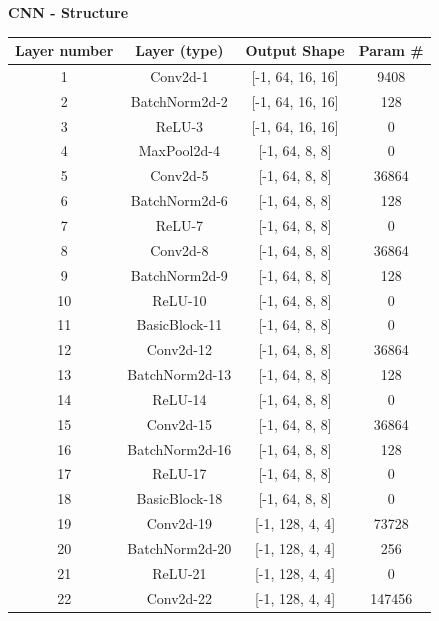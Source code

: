 \documentclass[UTF-8]{article}
\begin{document}
\newpage
\textbf{CNN - Structure}
\begin{center}
	\begin{tabular}{|c|c|c|c|}
		\hline
		Layer number &         Layer (type)   &     Output Shape   &   Param \# \\
		\hline
		\hline
		1 &             Conv2d-1   & [-1, 64, 16, 16]   & 9408 \\
		\hline
		2 &        BatchNorm2d-2   & [-1, 64, 16, 16]   & 128 \\
		\hline
		3 &               ReLU-3   & [-1, 64, 16, 16]   & 0 \\
		\hline
		4 &          MaxPool2d-4   &   [-1, 64, 8, 8]   & 0 \\
		\hline
		5 &             Conv2d-5   &   [-1, 64, 8, 8]   & 36864 \\
		\hline
		6 &        BatchNorm2d-6   &   [-1, 64, 8, 8]   & 128 \\
		\hline
		7 &               ReLU-7   &   [-1, 64, 8, 8]   & 0 \\
		\hline
		8 &             Conv2d-8   &   [-1, 64, 8, 8]   & 36864 \\
		\hline
		9 &        BatchNorm2d-9   &   [-1, 64, 8, 8]   & 128 \\
		\hline
		10 &              ReLU-10   &   [-1, 64, 8, 8]   & 0 \\
		\hline
		11 &        BasicBlock-11   &   [-1, 64, 8, 8]   & 0 \\
		\hline
		12 &            Conv2d-12   &   [-1, 64, 8, 8]   & 36864 \\
		\hline
		13 &       BatchNorm2d-13   &   [-1, 64, 8, 8]   & 128 \\
		\hline
		14 &              ReLU-14   &   [-1, 64, 8, 8]   & 0 \\
		\hline
		15 &            Conv2d-15   &   [-1, 64, 8, 8]   & 36864 \\
		\hline
		16 &       BatchNorm2d-16   &   [-1, 64, 8, 8]   & 128 \\
		\hline
		17 &              ReLU-17   &   [-1, 64, 8, 8]   & 0 \\
		\hline
		18 &        BasicBlock-18   &   [-1, 64, 8, 8]   & 0 \\
		\hline
		19 &            Conv2d-19   &  [-1, 128, 4, 4]   & 73728 \\
		\hline
		20 &       BatchNorm2d-20   &  [-1, 128, 4, 4]   & 256 \\
		\hline
		21 &              ReLU-21   &  [-1, 128, 4, 4]   & 0 \\
		\hline
		22 &            Conv2d-22   &  [-1, 128, 4, 4]   & 147456 \\

\end{tabular}
\end{center}
\end{document}
